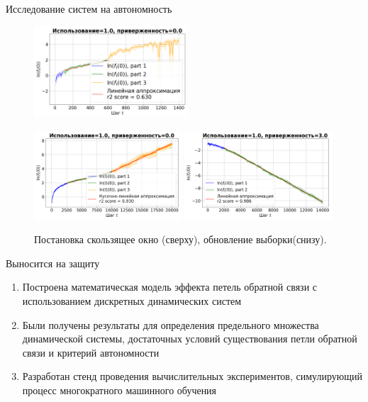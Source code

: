 \documentclass{beamer}
\begin{document}
    \begin{frame}{Исследование систем на автономность}
        \begin{figure}
            \centering
            \includegraphics[width=0.51\textwidth]{fig/aut_sw_synthetic_sgd_model_50_1.0_0.0.png}
            
            \includegraphics[width=0.49\textwidth]{fig/aut_su_synthetic_sgd_model_50_1.0_0.0.png}
            \includegraphics[width=0.49\textwidth]{fig/aut_su_synthetic_sgd_model_50_1.0_3.0.png}

            Постановка скользящее окно (сверху), обновление выборки(снизу).
        \end{figure}
    \end{frame}
\begin{frame}{Выносится на защиту}
    \begin{enumerate}
        \item Построена математическая модель эффекта петель обратной связи с использованием дискретных динамических систем
        \item Были получены результаты для определения предельного множества динамической системы, достаточных условий существования петли обратной связи и критерий автономности
        \item Разработан стенд проведения вычислительных экспериментов, симулирующий процесс многократного машинного обучения
    \end{enumerate}
\end{frame}
\end{document}
